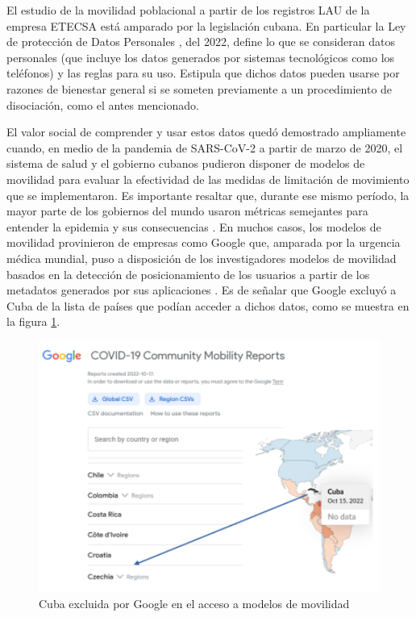El estudio de la movilidad poblacional a partir de los registros LAU de la empresa ETECSA está amparado por la legislación cubana. En particular la Ley de protección de Datos Personales \cite{cuervo2022resolucion}, del 2022, define lo que se consideran datos personales (que incluye los datos generados por sistemas tecnológicos como los teléfonos) y las reglas para su uso. Estipula que dichos datos pueden usarse por razones de bienestar general si se someten previamente a un procedimiento de disociación, como el antes mencionado.

El valor social de comprender y usar estos datos quedó demostrado ampliamente cuando, en medio de la pandemia de SARS-CoV-2 a partir de marzo de 2020, el sistema de salud y el gobierno cubanos pudieron disponer de modelos de movilidad para evaluar la efectividad de las medidas de limitación de movimiento que se implementaron. Es importante resaltar que, durante ese mismo período, la mayor parte de los gobiernos del mundo usaron métricas semejantes para entender la epidemia y sus consecuencias \cite{sulyok2020community, saha2020lockdown, nanda2022community, hakim2021mitigation}. En muchos casos, los modelos de movilidad provinieron de empresas como Google que, amparada por la urgencia médica mundial, puso a disposición de los investigadores modelos de movilidad basados en la detección de posicionamiento de los usuarios a partir de los metadatos generados por sus aplicaciones \cite{Google2020Mobility}. Es de señalar que Google excluyó a Cuba de la lista de países que podían acceder a dichos datos, como se muestra en la figura \ref{fig:google_exclusion}.

\begin{figure}[!htb] 
    \centering \includegraphics[width=1\textwidth]{Graphics/google_exclusion.pdf} \caption{Cuba excluida por Google en el acceso a modelos de movilidad} \label{fig:google_exclusion}
\end{figure}

